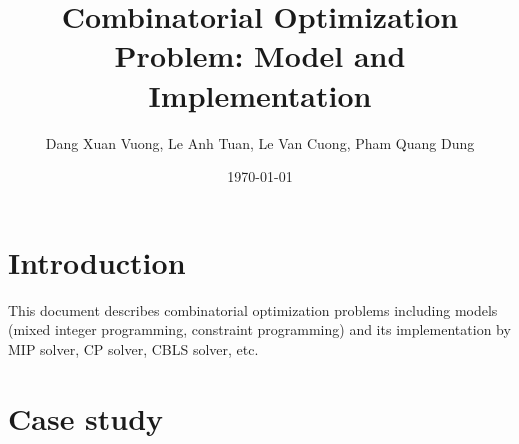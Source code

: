 \documentclass[11pt]{book}
\title{\bf Combinatorial Optimization Problem: Model and Implementation}    %
\author{Dang Xuan Vuong, Le Anh Tuan, Le Van Cuong, Pham Quang Dung}              %
\date{\today}                           %
\begin{document}
\frontmatter                            %
\maketitle                              %
\tableofcontents                        %
\mainmatter                             %

\chapter{Introduction}
This document describes combinatorial optimization problems including models (mixed integer programming, constraint programming) and its implementation by MIP solver, CP solver, CBLS solver, etc. 
\chapter{Case study} 

\end{document}
